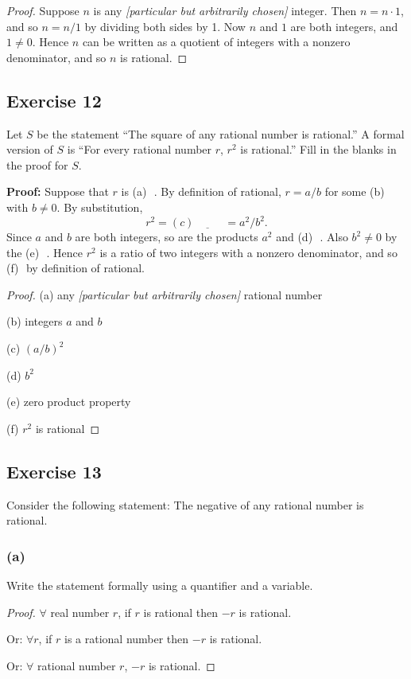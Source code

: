 \documentclass[14pt]{extarticle}
\newcommand{\fbl}{\underline{\hspace{1cm}}\,\,}
\newcommand{\fa}{\forall}
\begin{document}
\begin{proof}
    Suppose $n$ is any {\it[particular but arbitrarily chosen]}
    integer. Then $n = n\cdot 1$, and so $n = n/1$ by dividing both sides by 1. Now $n$ and $1$ are both integers, and $1 \neq 0$. Hence $n$ can be written as a quotient of integers with a nonzero denominator, and so $n$ is rational.
\end{proof}

\subsection{Exercise 12}
Let $S$ be the statement “The square of any rational number is rational.” A formal version of $S$ is “For every rational number $r$, $r^2$ is rational.” Fill in the blanks in the proof for $S$.

    {\bf Proof:} Suppose that $r$ is (a) \fbl. By definition of rational, $r = a/b$ for some (b) \fbl with $b \neq 0$. By substitution,
\[
    r^2 = (c) \fbl = a^2/b^2.
\]
Since $a$ and $b$ are both integers, so are the products $a^2$ and (d) \fbl. Also $b^2 \neq 0$ by the (e) \fbl. Hence $r^2$ is a ratio of two integers with a nonzero denominator, and so (f) \fbl by definition of rational.

\begin{proof}
    (a) any {\it [particular but arbitrarily chosen]} rational number

    (b) integers $a$ and $b$

    (c) $(a/b)^2$

    (d) $b^2$

    (e) zero product property

    (f) $r^2$ is rational
\end{proof}

\subsection{Exercise 13}
Consider the following statement: The negative of any rational number is rational.

\subsubsection{(a)}
Write the statement formally using a quantifier and a variable.

\begin{proof}
    $\fa$ real number $r$, if $r$ is rational then $-r$ is rational.

    Or: $\fa r$, if $r$ is a rational number then $-r$ is rational.

    Or: $\fa$ rational number $r$, $-r$ is rational.
\end{proof}
\end{document}
